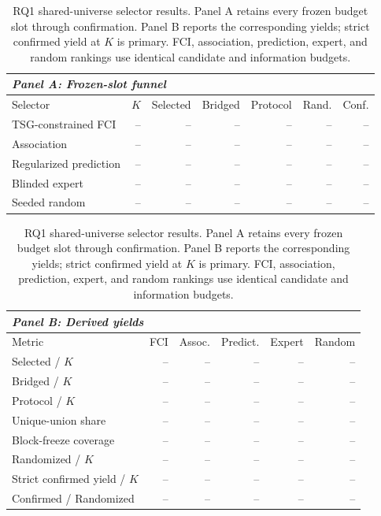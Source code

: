 \begin{table}[H]
  \centering
  \small
  \caption{RQ1 shared-universe selector results. Panel A retains every frozen
  budget slot through confirmation. Panel B reports the corresponding yields;
  strict confirmed yield at $K$ is primary. FCI, association, prediction,
  expert, and random rankings use identical candidate and information
  budgets.}
  \label{tab:rq1}
  \begin{tabular}{lrrrrrr}
    \toprule
    \multicolumn{7}{l}{\textit{Panel A: Frozen-slot funnel}} \\
    \midrule
    Selector & $K$ & Selected & Bridged & Protocol & Rand. & Conf. \\
    \midrule
    TSG-constrained FCI & -- & -- & -- & -- & -- & -- \\
    Association & -- & -- & -- & -- & -- & -- \\
    Regularized prediction & -- & -- & -- & -- & -- & -- \\
    Blinded expert & -- & -- & -- & -- & -- & -- \\
    Seeded random & -- & -- & -- & -- & -- & -- \\
    \bottomrule
  \end{tabular}

  \medskip
  \begin{tabular}{lrrrrr}
    \toprule
    \multicolumn{6}{l}{\textit{Panel B: Derived yields}} \\
    \midrule
    Metric & FCI & Assoc. & Predict. & Expert & Random \\
    \midrule
    Selected / $K$ & -- & -- & -- & -- & -- \\
    Bridged / $K$ & -- & -- & -- & -- & -- \\
    Protocol / $K$ & -- & -- & -- & -- & -- \\
    Unique-union share & -- & -- & -- & -- & -- \\
    Block-freeze coverage & -- & -- & -- & -- & -- \\
    Randomized / $K$ & -- & -- & -- & -- & -- \\
    Strict confirmed yield / $K$ & -- & -- & -- & -- & -- \\
    Confirmed / Randomized & -- & -- & -- & -- & -- \\
    \bottomrule
  \end{tabular}
\end{table}
